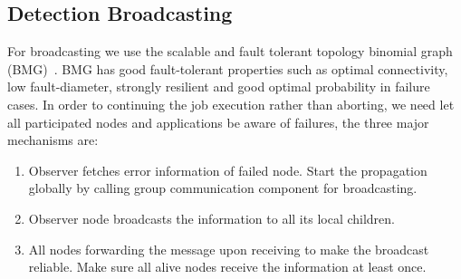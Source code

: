 \documentclass[sigconf]{acmart}
\begin{document}
\subsection{Detection Broadcasting}
For broadcasting we use the scalable and fault tolerant topology binomial graph (BMG)~\cite{Angskun07}. BMG has good fault-tolerant properties such as optimal connectivity, low fault-diameter, strongly resilient and good optimal probability in failure cases. In order to continuing the job execution rather than aborting, we need let all participated nodes and applications be aware of failures, the three major mechanisms are: 
\begin{enumerate}
  \item Observer fetches error information of failed node. Start the propagation globally by calling group communication component for broadcasting.
  \item Observer node broadcasts the information to all its local children. 
  \item All nodes forwarding the message upon receiving to make the broadcast reliable. Make sure all alive nodes receive the information at least once. 
\end{enumerate}
\end{document}
